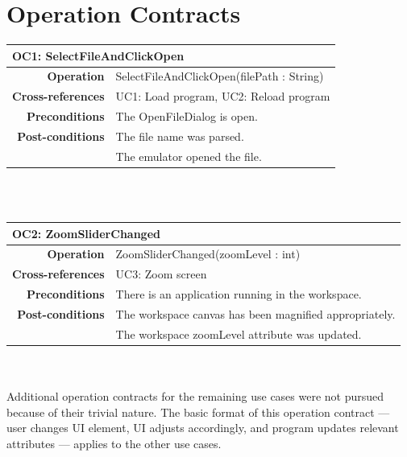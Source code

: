 \documentclass[12pt]{article}
\begin{document}
\section{Operation Contracts}
\begin{tabular*}{\textwidth}{r | l}
  \multicolumn{2}{l}{\textbf{OC1: SelectFileAndClickOpen}} \\ \hline
  \textbf{Operation} & SelectFileAndClickOpen(filePath : String) \\
  \textbf{Cross-references} & UC1: Load  program, UC2: Reload program \\
  \textbf{Preconditions} & The OpenFileDialog is open. \\
  \textbf{Post-conditions} & The file name was parsed. \\
                            & The emulator opened the file. \\ \hline
\end{tabular*} \\\\

\begin{tabular*}{\textwidth}{r | l}
  \multicolumn{2}{l}{\textbf{OC2: ZoomSliderChanged}} \\ \hline
  \textbf{Operation} & ZoomSliderChanged(zoomLevel : int) \\
  \textbf{Cross-references} & UC3: Zoom screen \\
  \textbf{Preconditions} & There is an application running in the workspace. \\
  \textbf{Post-conditions} & The workspace canvas has been magnified appropriately. \\
                           & The workspace zoomLevel attribute was updated. \\ \hline
\end{tabular*} \\\\

Additional operation contracts for the remaining use cases were not pursued because of their trivial nature. The basic format of this operation contract --- user changes UI element, UI adjusts accordingly, and program updates relevant attributes --- applies to the other use cases.

\clearpage
\end{document}
